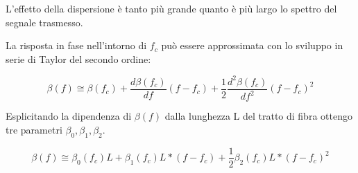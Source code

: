 \documentclass[12pt, a4paper]{article}
\begin{document}
L'effetto della dispersione è tanto più grande quanto è più largo lo spettro del segnale trasmesso.

\vspace{5mm}
La risposta in fase nell'intorno di $f_c$ può essere approssimata con lo sviluppo in serie di Taylor del secondo ordine:

\begin{equation}
	\beta(f) \cong \beta(f_c) + \frac{d\beta(f_c)}{df}(f-f_c) + \frac{1}{2}\frac{d^2\beta(f_c)}{df^2}(f-f_c)^2
\end{equation}

Esplicitando  la dipendenza di $\beta(f)$ dalla lunghezza L del tratto di fibra ottengo tre parametri $\beta_0 , \beta_1, \beta_2$.

\begin{equation}
	\beta(f) \cong \beta_0(f_c)L + \beta_1(f_c)L*(f-f_c) + \frac{1}{2}\beta_2(f_c)L*(f-f_c)^2
\end{equation}
\end{document}
